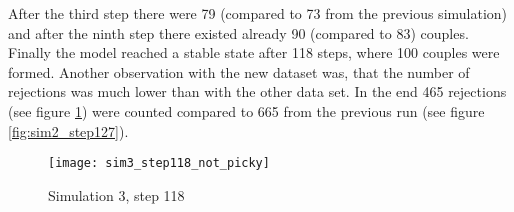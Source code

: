 After the third step there were 79 (compared to 73 from the previous simulation) and after the ninth step there existed already 90 (compared to 83) couples.
Finally the model reached a stable state after 118 steps, where 100 couples were formed.
Another observation with the new dataset was, that the number of rejections was much lower than with the other data set. 
In the end 465 rejections (see figure \ref{fig:sim3_step118_not_picky}) were counted compared to 665 from the previous run (see figure \ref{fig:sim2_step127}).
\begin{figure}[H]
  \centering
  \texttt{[image: sim3\_step118\_not\_picky]}
	\caption{Simulation 3, step 118}
	\label{fig:sim3_step118_not_picky}
\end{figure}
